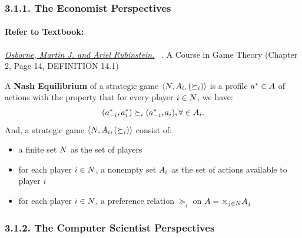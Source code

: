 \documentclass[runningheads]{llncs}
\begin{document}
\subsubsection{3.1.1. The Economist Perspectives}
\paragraph{Refer to Textbook:} 
\href{https://www.sciencedirect.com/science/article/pii/S0899825699907236}{\textit{\underline{Osborne, Martin J. and Ariel Rubinstein.}}}~
\citeyear{osborne1994course}. A Course in Game Theory (Chapter 2, Page 14, DEFINITION 14.1)

\begin{definition}
A \textbf{Nash Equilibrium} of a strategic game $\langle\mathnormal{N}, \mathnormal{A_{i}},(\succeq_{i})\rangle$ is a profile $a^{*}\in\mathnormal{A}$ of actions with the property that for every player $i\in \mathnormal{N}$, we have:
$$(a^{*}_{-i},a^{*}_{i}) \succeq_{i}(a^{*}_{-i},a_{i}), \forall \in \mathnormal{A_{i}}.$$
And, a strategic game $\langle\mathnormal{N}, \mathnormal{A_{i}},(\succeq_{i})\rangle$  consist of:
\begin{itemize}
    \item a finite set $\mathnormal{N}$ as the set of players
    \item for each player $i\in\mathnormal{N}$, a nonempty set $\mathnormal{A_{i}}$ as the set of actions available to player $i$
    \item for each player $i\in\mathnormal{N}$, a preference relation $\succeq_{i}$ on $\mathnormal{A}=\times_{j\in \mathnormal{N}}\mathnormal{A}_{j}$
\end{itemize}
\end{definition}

\subsubsection{3.1.2. The Computer Scientist Perspectives}
\end{document}
